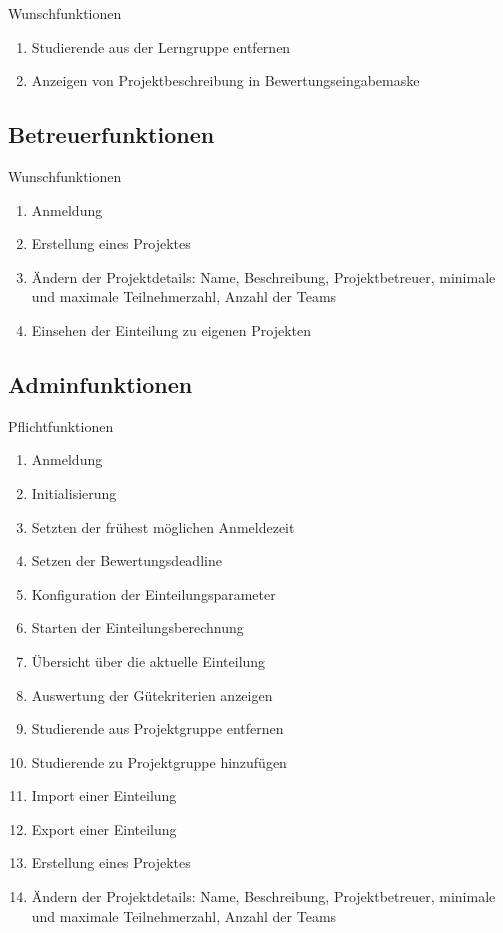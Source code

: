 \documentclass[parskip=full]{scrartcl}
\newcommand{\swtLabel}[1]{\textbf{\textbackslash #1\arabic*0\textbackslash}}
\begin{document}
Wunschfunktionen

\begin{enumerate}[label=\swtLabel{FA}, resume]
	\item Studierende aus der Lerngruppe entfernen
	\item Anzeigen von Projektbeschreibung in Bewertungseingabemaske
\end{enumerate}

\subsection{Betreuerfunktionen}

Wunschfunktionen

\begin{enumerate}[label=\swtLabel{FA}, resume]
  \item Anmeldung
  \item Erstellung eines Projektes
  \item Ändern der Projektdetails: Name, Beschreibung, Projektbetreuer,
        minimale und maximale Teilnehmerzahl, Anzahl der Teams
  \item Einsehen der Einteilung zu eigenen Projekten
\end{enumerate}

\subsection{Adminfunktionen}

Pflichtfunktionen

\begin{enumerate}[label=\swtLabel{FA}, resume]
  \item Anmeldung
  \item Initialisierung
  \item Setzten der frühest möglichen Anmeldezeit
  \item Setzen der Bewertungsdeadline
  \item Konfiguration der Einteilungsparameter
  \item Starten der Einteilungsberechnung
  \item Übersicht über die aktuelle Einteilung
  \item Auswertung der Gütekriterien anzeigen
  \item Studierende aus Projektgruppe entfernen
  \item Studierende zu Projektgruppe hinzufügen
  \item Import einer Einteilung
  \item Export einer Einteilung
  \item Erstellung eines Projektes
  \item Ändern der Projektdetails: Name, Beschreibung, Projektbetreuer, 
        minimale und maximale Teilnehmerzahl, Anzahl der Teams 
\end{enumerate}
\end{document}
